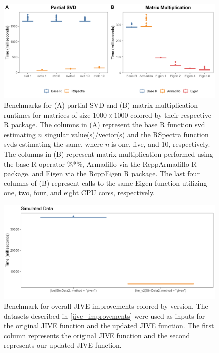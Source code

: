 \documentclass[unnumsec,webpdf,contemporary,large]{oup-authoring-template}%
\theoremstyle{thmstyleone}%
\theoremstyle{thmstyletwo}%
\theoremstyle{thmstylethree}%
\begin{document}
\begin{figure}[ht]
    \centering 
    \includegraphics[width=1\columnwidth]{both_benchmark} 
    \caption[Benchmark for Partial SVD and Matrix Multiplication Runtimes.]{Benchmarks for (A) partial SVD and (B) matrix multiplication runtimes for matrices of size $1000 \times 1000$ colored by their respective R package. The columns in (A) represent the base R function svd estimating $n$ singular value(s)/vector(s) and the RSpectra function svds estimating the same, where $n$ is one, five, and 10, respectively. The columns in (B) represent matrix multiplication performed using the base R operator \%*\%, Armadillo via the RcppArmadillo R package, and Eigen via the RcppEigen R package. The last four columns of (B) represent calls to the same Eigen function utilizing one, two, four, and eight CPU cores, respectively.}
    \label{fig:both_benchmark} 
\end{figure}

\begin{figure}[ht]
    \centering 
    \includegraphics[width=1\columnwidth]{jive_v2_simdata2_benchmark} 
    \caption[Benchmark for JIVE Improvements]{Benchmark for overall JIVE improvements colored by version. The datasets described in \ref{jive_improvements} were used as inputs for the original JIVE function and the updated JIVE function. The first column represents the original JIVE function and the second represents our updated JIVE function.}
    \label{fig:jive_v2_simdata2_benchmark} 
\end{figure}
\end{document}
